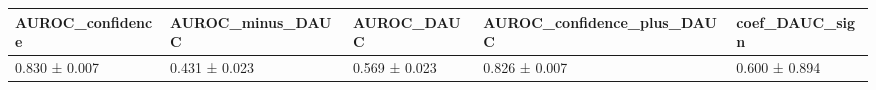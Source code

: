 \begin{tabular}{lllll}
\toprule
AUROC_confidence & AUROC_minus_DAUC & AUROC_DAUC & AUROC_confidence_plus_DAUC & coef_DAUC_sign \\
\midrule
0.830 ± 0.007 & 0.431 ± 0.023 & 0.569 ± 0.023 & 0.826 ± 0.007 & 0.600 ± 0.894 \\
\bottomrule
\end{tabular}
